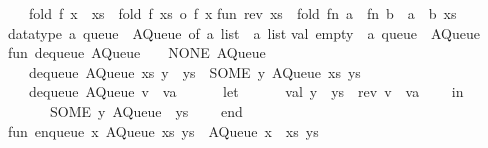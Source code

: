 \begin{isabellebody}
\begin{isamarkuptext}
\ \ {\isacharbar}\ fold\ f\ {\isacharparenleft}x\ {\isacharcolon}{\isacharcolon}\ xs{\isacharparenright}\ {\isacharequal}\ fold\ f\ xs\ o\ f\ x{\isacharsemicolon}\isanewline
\isanewline
fun\ rev\ xs\ {\isacharequal}\ fold\ {\isacharparenleft}fn\ a\ {\isacharequal}{\isachargreater}\ fn\ b\ {\isacharequal}{\isachargreater}\ a\ {\isacharcolon}{\isacharcolon}\ b{\isacharparenright}\ xs\ {\isacharbrackleft}{\isacharbrackright}{\isacharsemicolon}\isanewline
\isanewline
datatype\ {\isacharprime}a\ queue\ {\isacharequal}\ AQueue\ of\ {\isacharprime}a\ list\ {\isacharasterisk}\ {\isacharprime}a\ list{\isacharsemicolon}\isanewline
\isanewline
val\ empty\ {\isacharcolon}\ {\isacharprime}a\ queue\ {\isacharequal}\ AQueue\ {\isacharparenleft}{\isacharbrackleft}{\isacharbrackright}{\isacharcomma}\ {\isacharbrackleft}{\isacharbrackright}{\isacharparenright}{\isacharsemicolon}\isanewline
\isanewline
fun\ dequeue\ {\isacharparenleft}AQueue\ {\isacharparenleft}{\isacharbrackleft}{\isacharbrackright}{\isacharcomma}\ {\isacharbrackleft}{\isacharbrackright}{\isacharparenright}{\isacharparenright}\ {\isacharequal}\ {\isacharparenleft}NONE{\isacharcomma}\ AQueue\ {\isacharparenleft}{\isacharbrackleft}{\isacharbrackright}{\isacharcomma}\ {\isacharbrackleft}{\isacharbrackright}{\isacharparenright}{\isacharparenright}\isanewline
\ \ {\isacharbar}\ dequeue\ {\isacharparenleft}AQueue\ {\isacharparenleft}xs{\isacharcomma}\ y\ {\isacharcolon}{\isacharcolon}\ ys{\isacharparenright}{\isacharparenright}\ {\isacharequal}\ {\isacharparenleft}SOME\ y{\isacharcomma}\ AQueue\ {\isacharparenleft}xs{\isacharcomma}\ ys{\isacharparenright}{\isacharparenright}\isanewline
\ \ {\isacharbar}\ dequeue\ {\isacharparenleft}AQueue\ {\isacharparenleft}v\ {\isacharcolon}{\isacharcolon}\ va{\isacharcomma}\ {\isacharbrackleft}{\isacharbrackright}{\isacharparenright}{\isacharparenright}\ {\isacharequal}\isanewline
\ \ \ \ let\isanewline
\ \ \ \ \ \ val\ y\ {\isacharcolon}{\isacharcolon}\ ys\ {\isacharequal}\ rev\ {\isacharparenleft}v\ {\isacharcolon}{\isacharcolon}\ va{\isacharparenright}{\isacharsemicolon}\isanewline
\ \ \ \ in\isanewline
\ \ \ \ \ \ {\isacharparenleft}SOME\ y{\isacharcomma}\ AQueue\ {\isacharparenleft}{\isacharbrackleft}{\isacharbrackright}{\isacharcomma}\ ys{\isacharparenright}{\isacharparenright}\isanewline
\ \ \ \ end{\isacharsemicolon}\isanewline
\isanewline
fun\ enqueue\ x\ {\isacharparenleft}AQueue\ {\isacharparenleft}xs{\isacharcomma}\ ys{\isacharparenright}{\isacharparenright}\ {\isacharequal}\ AQueue\ {\isacharparenleft}x\ {\isacharcolon}{\isacharcolon}\ xs{\isacharcomma}\ ys{\isacharparenright}{\isacharsemicolon}\isanewline

\end{isamarkuptext}
\end{isabellebody}
